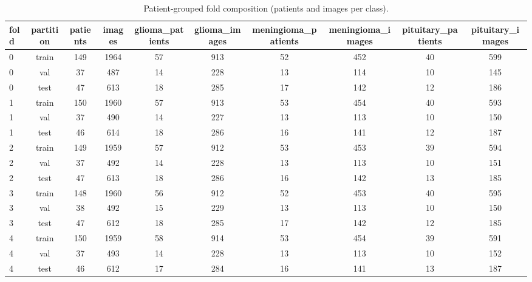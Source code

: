 \begin{table}[t]
\centering
\caption{Patient-grouped fold composition (patients and images per class).}
\label{tab:table1_split_composition}
\small
\begin{tabular}{lccccccccc}
\toprule
fold & partition & patients & images & glioma\_patients & glioma\_images & meningioma\_patients & meningioma\_images & pituitary\_patients & pituitary\_images \\
\midrule
0 & train & 149 & 1964 & 57 & 913 & 52 & 452 & 40 & 599 \\
0 & val & 37 & 487 & 14 & 228 & 13 & 114 & 10 & 145 \\
0 & test & 47 & 613 & 18 & 285 & 17 & 142 & 12 & 186 \\
1 & train & 150 & 1960 & 57 & 913 & 53 & 454 & 40 & 593 \\
1 & val & 37 & 490 & 14 & 227 & 13 & 113 & 10 & 150 \\
1 & test & 46 & 614 & 18 & 286 & 16 & 141 & 12 & 187 \\
2 & train & 149 & 1959 & 57 & 912 & 53 & 453 & 39 & 594 \\
2 & val & 37 & 492 & 14 & 228 & 13 & 113 & 10 & 151 \\
2 & test & 47 & 613 & 18 & 286 & 16 & 142 & 13 & 185 \\
3 & train & 148 & 1960 & 56 & 912 & 52 & 453 & 40 & 595 \\
3 & val & 38 & 492 & 15 & 229 & 13 & 113 & 10 & 150 \\
3 & test & 47 & 612 & 18 & 285 & 17 & 142 & 12 & 185 \\
4 & train & 150 & 1959 & 58 & 914 & 53 & 454 & 39 & 591 \\
4 & val & 37 & 493 & 14 & 228 & 13 & 113 & 10 & 152 \\
4 & test & 46 & 612 & 17 & 284 & 16 & 141 & 13 & 187 \\
\bottomrule
\end{tabular}
\end{table}

